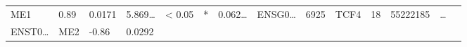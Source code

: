 \documentclass[
]{article}
\begin{document}
\begin{longtable}[]{@{}llllllllllllll@{}}
\begin{minipage}[t]{0.04\columnwidth}
ME1\strut
\end{minipage} & \begin{minipage}[t]{0.04\columnwidth}\raggedright
0.89\strut
\end{minipage} & \begin{minipage}[t]{0.04\columnwidth}\raggedright
0.0171\strut
\end{minipage} & \begin{minipage}[t]{0.05\columnwidth}\raggedright
5.869\ldots{}\strut
\end{minipage} & \begin{minipage}[t]{0.05\columnwidth}\raggedright
\textless{} 0.05\strut
\end{minipage} & \begin{minipage}[t]{0.03\columnwidth}\raggedright
*\strut
\end{minipage} & \begin{minipage}[t]{0.05\columnwidth}\raggedright
0.062\ldots{}\strut
\end{minipage} & \begin{minipage}[t]{0.05\columnwidth}\raggedright
ENSG0\ldots{}\strut
\end{minipage} & \begin{minipage}[t]{0.05\columnwidth}\raggedright
6925\strut
\end{minipage} & \begin{minipage}[t]{0.05\columnwidth}\raggedright
TCF4\strut
\end{minipage} & \begin{minipage}[t]{0.05\columnwidth}\raggedright
18\strut
\end{minipage} & \begin{minipage}[t]{0.05\columnwidth}\raggedright
55222185\strut
\end{minipage} & \begin{minipage}[t]{0.02\columnwidth}\raggedright
\ldots{}\strut
\end{minipage}\tabularnewline
\begin{minipage}[t]{0.05\columnwidth}\raggedright
ENST0\ldots{}\strut
\end{minipage} & \begin{minipage}[t]{0.04\columnwidth}\raggedright
ME2\strut
\end{minipage} & \begin{minipage}[t]{0.04\columnwidth}\raggedright
-0.86\strut
\end{minipage} & \begin{minipage}[t]{0.04\columnwidth}\raggedright
0.0292\strut

\end{minipage}
\end{longtable}
\end{document}
